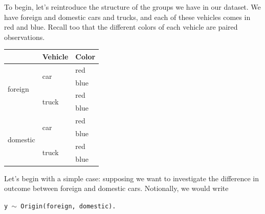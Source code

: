 \documentclass{article}
\begin{document}
To begin, let's reintroduce the structure of the groups we have in our dataset. We have foreign and domestic cars and trucks, and each of these vehicles comes in red and blue. Recall too that the different colors of each vehicle are paired observations.


\begin{center}

\begin{tabular}{|p{0.9in}|p{0.9in}|p{0.9in}|} \hline 
\rowcolor{lightgray} \multicolumn{1}{|c|}{Origin} & \multicolumn{1}{c|}{Vehicle} & \multicolumn{1}{c|}{Color}\\
\hline
\multirow{4}{*}{foreign} & \multirow{2}{*}{car} & red \\
\hhline{~~-}
& & blue \\
\hhline{~--}
& \multirow{2}{*}{truck} & red \\
\hhline{~~-}
& & blue \\
\hline
\multirow{4}{*}{domestic} & \multirow{2}{*}{car} & red \\
\hhline{~~-}
& & blue \\
\hhline{~--}
& \multirow{2}{*}{truck} & red \\
\hhline{~~-}
& & blue \\
\hline
\end{tabular}
\end{center}

Let's begin with a simple case: supposing we want to investigate the difference in outcome between foreign and domestic cars. Notionally, we would write

\begin{center}
\tt y $\sim$ Origin(foreign, domestic).
\end{center}
\end{document}
